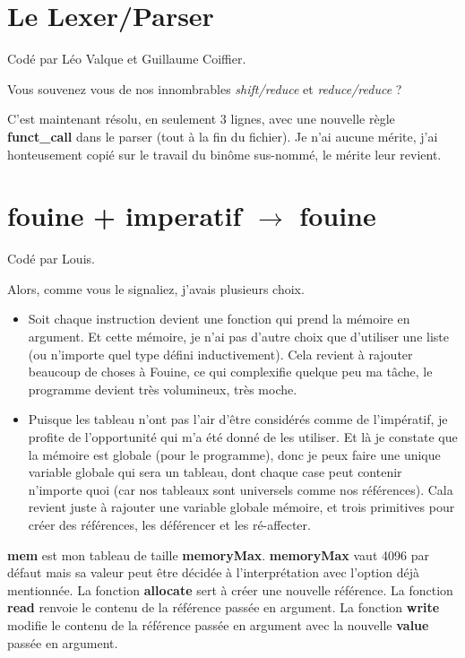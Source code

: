 \documentclass[a4paper,10pt]{report}
\begin{document}
\section{Le Lexer/Parser}  
Codé par Léo Valque et Guillaume Coiffier.  
  
Vous souvenez vous de nos innombrables \textit{shift/reduce} et \textit{reduce/reduce} ?  
  
C'est maintenant résolu, en seulement 3 lignes, avec une nouvelle règle \textbf{funct\_{}call} dans le parser (tout à la fin du fichier). Je n'ai aucune mérite, j'ai honteusement copié sur le travail du binôme sus-nommé, le mérite leur revient.  

\newpage
  
\section{fouine + imperatif $\rightarrow$ fouine}  
Codé par Louis.  
  
Alors, comme vous le signaliez, j'avais plusieurs choix.  

\begin{itemize}
\item Soit chaque instruction devient une fonction qui prend la mémoire en argument. Et cette mémoire, je n'ai pas d'autre choix que d'utiliser une liste (ou n'importe quel type défini inductivement). Cela revient à rajouter beaucoup de choses à Fouine, ce qui complexifie quelque peu ma tâche, le programme devient très volumineux, très moche. 
\item Puisque les tableau n'ont pas l'air d'être considérés comme de l'impératif, je profite de l'opportunité qui m'a été donné de les utiliser. Et là je constate que la mémoire est globale (pour le programme), donc je peux faire une unique variable globale qui sera un tableau, dont chaque case peut contenir n'importe quoi (car nos tableaux sont universels comme nos références). Cala revient juste à rajouter une variable globale mémoire, et trois primitives pour créer des références, les déférencer et les ré-affecter.  
\end{itemize}

\textbf{mem} est mon tableau de taille \textbf{memoryMax}. \textbf{memoryMax} vaut 4096 par défaut mais sa valeur peut être décidée à l'interprétation avec l'option déjà mentionnée. La fonction \textbf{allocate} sert à créer une nouvelle référence. La fonction \textbf{read} renvoie le contenu de la référence passée en argument. La fonction \textbf{write} modifie le contenu de la référence passée en argument avec la nouvelle \textbf{value} passée en argument.
  
\end{document}
